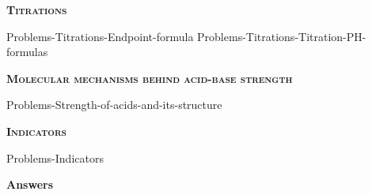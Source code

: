 \documentclass[main.tex]{subfiles}
\newcommand\chapterlabel{Ch-acidbase}
\begin{document}
\begin{multicols*}{2}
{\raggedright\textsc{\textbf{Titrations}}\par}
 {Problems-Titrations-Endpoint-formula}
 {Problems-Titrations-Titration-PH-formulas}%

 {\raggedright\textsc{\textbf{Molecular mechanisms behind acid-base strength}}\par}%
 {Problems-Strength-of-acids-and-its-structure}%

 {\raggedright\textsc{\textbf{Indicators}}\par}%
 {Problems-Indicators}%

\end{multicols*}
\newpage
\begin{answersenvironment}
\begin{minipage}[c]{1\textwidth}
\begin{localsize}{10}
{\Large \bf Answers}
 \printsolutions[byID={1,3,5,7,9,11,13,15,17,19,21,23,25,27,29,31,33,35,37, 39, 41, 43, 45, 47, 49, 51,53,55,57,59}]
\end{localsize}
\end{minipage}\end{answersenvironment}
\end{document}
